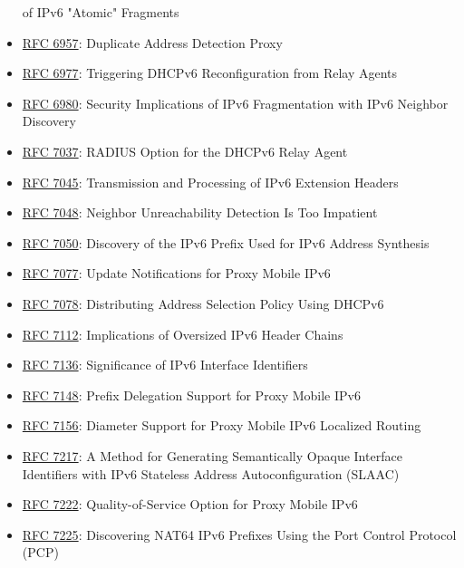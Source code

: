 \documentclass[
]{article}
\begin{document}
\begin{itemize}
  of IPv6 "Atomic" Fragments
\item
  \href{https://www.rfc-editor.org/info/rfc6957}{RFC 6957}: Duplicate
  Address Detection Proxy
\item
  \href{https://www.rfc-editor.org/info/rfc6977}{RFC 6977}: Triggering
  DHCPv6 Reconfiguration from Relay Agents
\item
  \href{https://www.rfc-editor.org/info/rfc6980}{RFC 6980}: Security
  Implications of IPv6 Fragmentation with IPv6 Neighbor Discovery
\item
  \href{https://www.rfc-editor.org/info/rfc7037}{RFC 7037}: RADIUS
  Option for the DHCPv6 Relay Agent
\item
  \href{https://www.rfc-editor.org/info/rfc7045}{RFC 7045}: Transmission
  and Processing of IPv6 Extension Headers
\item
  \href{https://www.rfc-editor.org/info/rfc7048}{RFC 7048}: Neighbor
  Unreachability Detection Is Too Impatient
\item
  \href{https://www.rfc-editor.org/info/rfc7050}{RFC 7050}: Discovery of
  the IPv6 Prefix Used for IPv6 Address Synthesis
\item
  \href{https://www.rfc-editor.org/info/rfc7077}{RFC 7077}: Update
  Notifications for Proxy Mobile IPv6
\item
  \href{https://www.rfc-editor.org/info/rfc7078}{RFC 7078}: Distributing
  Address Selection Policy Using DHCPv6
\item
  \href{https://www.rfc-editor.org/info/rfc7112}{RFC 7112}: Implications
  of Oversized IPv6 Header Chains
\item
  \href{https://www.rfc-editor.org/info/rfc7136}{RFC 7136}: Significance
  of IPv6 Interface Identifiers
\item
  \href{https://www.rfc-editor.org/info/rfc7148}{RFC 7148}: Prefix
  Delegation Support for Proxy Mobile IPv6
\item
  \href{https://www.rfc-editor.org/info/rfc7156}{RFC 7156}: Diameter
  Support for Proxy Mobile IPv6 Localized Routing
\item
  \href{https://www.rfc-editor.org/info/rfc7217}{RFC 7217}: A Method for
  Generating Semantically Opaque Interface Identifiers with IPv6
  Stateless Address Autoconfiguration (SLAAC)
\item
  \href{https://www.rfc-editor.org/info/rfc7222}{RFC 7222}:
  Quality-of-Service Option for Proxy Mobile IPv6
\item
  \href{https://www.rfc-editor.org/info/rfc7225}{RFC 7225}: Discovering
  NAT64 IPv6 Prefixes Using the Port Control Protocol (PCP)

\end{itemize}
\end{document}
